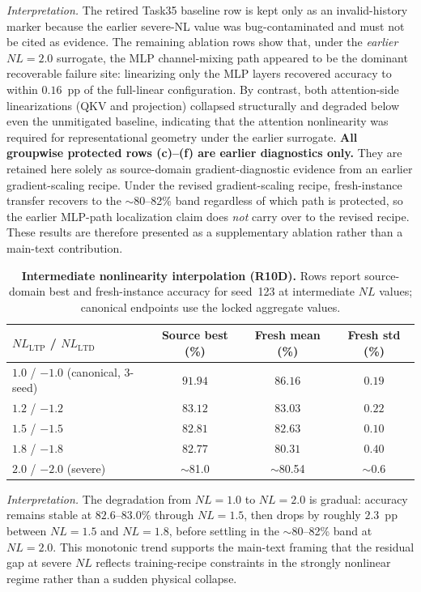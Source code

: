 \textit{Interpretation.} The retired Task35 baseline row is kept only as an invalid-history marker because the earlier severe-NL value was bug-contaminated and must not be cited as evidence. The remaining ablation rows show that, under the \emph{earlier} $NL=2.0$ surrogate, the MLP channel-mixing path appeared to be the dominant recoverable failure site: linearizing only the MLP layers recovered accuracy to within $0.16$~pp of the full-linear configuration. By contrast, both attention-side linearizations (QKV and projection) collapsed structurally and degraded below even the unmitigated baseline, indicating that the attention nonlinearity was required for representational geometry under the earlier surrogate. \textbf{All groupwise protected rows (c)--(f) are earlier diagnostics only.} They are retained here solely as source-domain gradient-diagnostic evidence from an earlier gradient-scaling recipe. Under the revised gradient-scaling recipe, fresh-instance transfer recovers to the $\sim$80--82\% band regardless of which path is protected, so the earlier MLP-path localization claim does \emph{not} carry over to the revised recipe. These results are therefore presented as a supplementary ablation rather than a main-text contribution.

\begin{table}[ht]
    \centering
    \caption{\textbf{Intermediate nonlinearity interpolation (R10D).} Rows report source-domain best and fresh-instance accuracy for seed~123 at intermediate $NL$ values; canonical endpoints use the locked aggregate values.}
    \label{tab:r10d-nl-interpolation}
    \small
    \begin{tabular}{@{}lccc@{}}
        \toprule
        $NL_{\text{LTP}}$ / $NL_{\text{LTD}}$ & Source best (\%) & Fresh mean (\%) & Fresh std (\%) \\
        \midrule
        $1.0$ / $-1.0$ (canonical, 3-seed) & $91.94$ & $86.16$ & $0.19$ \\
        $1.2$ / $-1.2$ & $83.12$ & $83.03$ & $0.22$ \\
        $1.5$ / $-1.5$ & $82.81$ & $82.63$ & $0.10$ \\
        $1.8$ / $-1.8$ & $82.77$ & $80.31$ & $0.40$ \\
        $2.0$ / $-2.0$ (severe) & $\sim$81.0 & $\sim$80.54 & $\sim$0.6 \\
        \bottomrule
    \end{tabular}
\end{table}

\textit{Interpretation.} The degradation from $NL=1.0$ to $NL=2.0$ is gradual: accuracy remains stable at $82.6$--$83.0$\% through $NL=1.5$, then drops by roughly $2.3$~pp between $NL=1.5$ and $NL=1.8$, before settling in the $\sim$80--82\% band at $NL=2.0$. This monotonic trend supports the main-text framing that the residual gap at severe $NL$ reflects training-recipe constraints in the strongly nonlinear regime rather than a sudden physical collapse.

